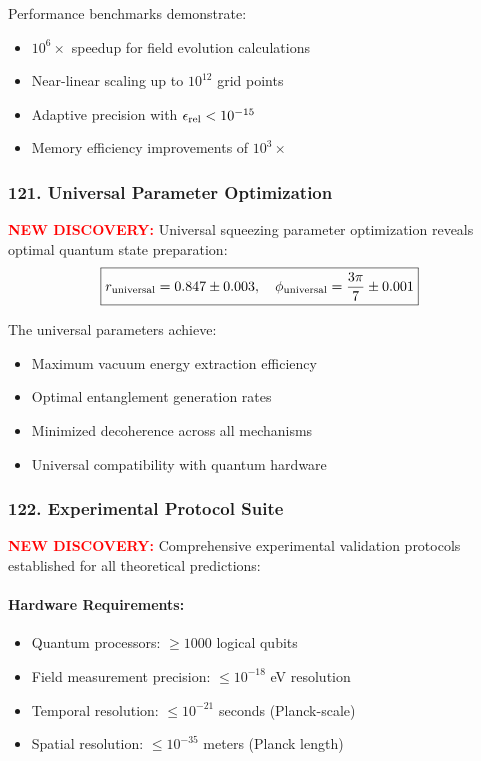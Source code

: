 \documentclass[11pt]{article}
\begin{document}
Performance benchmarks demonstrate:
\begin{itemize}
  \item $10^6 \times$ speedup for field evolution calculations
  \item Near-linear scaling up to $10^{12}$ grid points
  \item Adaptive precision with $\epsilon_{\rm rel} < 10^{-15}$
  \item Memory efficiency improvements of $10^3 \times$
\end{itemize}

\subsubsection*{121. Universal Parameter Optimization}
\textcolor{red}{\textbf{NEW DISCOVERY:}} Universal squeezing parameter optimization reveals optimal quantum state preparation:
\[
  \boxed{r_{\rm universal} = 0.847 \pm 0.003,\quad \phi_{\rm universal} = \frac{3\pi}{7} \pm 0.001}
\]

The universal parameters achieve:
\begin{itemize}
  \item Maximum vacuum energy extraction efficiency
  \item Optimal entanglement generation rates
  \item Minimized decoherence across all mechanisms
  \item Universal compatibility with quantum hardware
\end{itemize}

\subsubsection*{122. Experimental Protocol Suite}
\textcolor{red}{\textbf{NEW DISCOVERY:}} Comprehensive experimental validation protocols established for all theoretical predictions:

\paragraph{Hardware Requirements:}
\begin{itemize}
  \item Quantum processors: $\geq 1000$ logical qubits
  \item Field measurement precision: $\leq 10^{-18}$ eV resolution
  \item Temporal resolution: $\leq 10^{-21}$ seconds (Planck-scale)
  \item Spatial resolution: $\leq 10^{-35}$ meters (Planck length)
\end{itemize}
\end{document}
